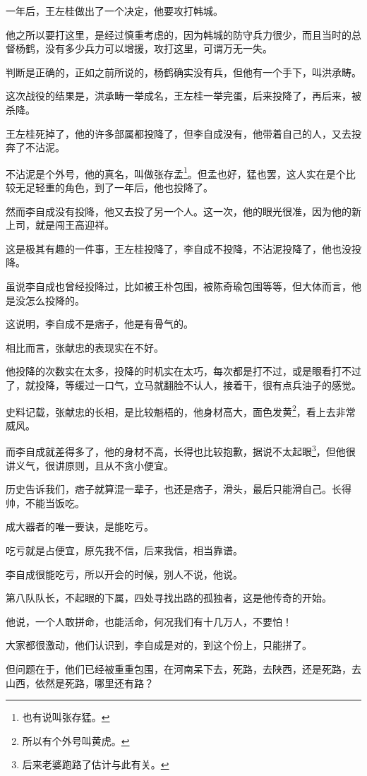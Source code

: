 \begin{multicols}{\theparacolNo}
一年后，王左桂做出了一个决定，他要攻打韩城。

他之所以要打这里，是经过慎重考虑的，因为韩城的防守兵力很少，而且当时的总督杨鹤，没有多少兵力可以增援，攻打这里，可谓万无一失。

判断是正确的，正如之前所说的，杨鹤确实没有兵，但他有一个手下，叫洪承畴。

这次战役的结果是，洪承畴一举成名，王左桂一举完蛋，后来投降了，再后来，被杀降。

王左桂死掉了，他的许多部属都投降了，但李自成没有，他带着自己的人，又去投奔了不沾泥。

不沾泥是个外号，他的真名，叫做张存孟\footnote{也有说叫张存猛。}。但孟也好，猛也罢，这人实在是个比较无足轻重的角色，到了一年后，他也投降了。

然而李自成没有投降，他又去投了另一个人。这一次，他的眼光很准，因为他的新上司，就是闯王高迎祥。

这是极其有趣的一件事，王左桂投降了，李自成不投降，不沾泥投降了，他也没投降。

虽说李自成也曾经投降过，比如被王朴包围，被陈奇瑜包围等等，但大体而言，他是没怎么投降的。

这说明，李自成不是痞子，他是有骨气的。

相比而言，张献忠的表现实在不好。

他投降的次数实在太多，投降的时机实在太巧，每次都是打不过，或是眼看打不过了，就投降，等缓过一口气，立马就翻脸不认人，接着干，很有点兵油子的感觉。

史料记载，张献忠的长相，是比较魁梧的，他身材高大，面色发黄\footnote{所以有个外号叫黄虎。}，看上去非常威风。

而李自成就差得多了，他的身材不高，长得也比较抱歉，据说不太起眼\footnote{后来老婆跑路了估计与此有关。}，但他很讲义气，很讲原则，且从不贪小便宜。

历史告诉我们，痞子就算混一辈子，也还是痞子，滑头，最后只能滑自己。长得帅，不能当饭吃。

成大器者的唯一要诀，是能吃亏。

吃亏就是占便宜，原先我不信，后来我信，相当靠谱。

李自成很能吃亏，所以开会的时候，别人不说，他说。

第八队队长，不起眼的下属，四处寻找出路的孤独者，这是他传奇的开始。

他说，一个人敢拼命，也能活命，何况我们有十几万人，不要怕！

大家都很激动，他们认识到，李自成是对的，到这个份上，只能拼了。

但问题在于，他们已经被重重包围，在河南呆下去，死路，去陕西，还是死路，去山西，依然是死路，哪里还有路？


\end{multicols}
